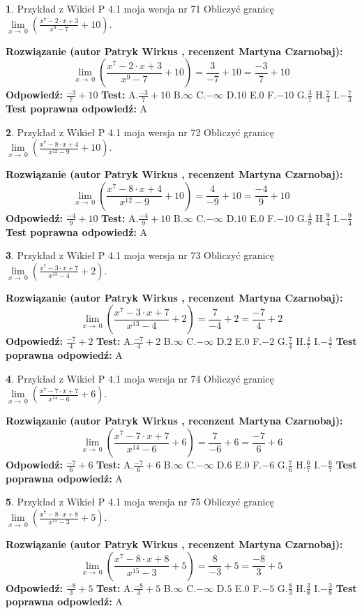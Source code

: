 \documentclass[12pt, a4paper]{article}
\theoremstyle{definition} %
\newtheorem{zad}{}
\newcommand{\zadStart}[1]{\begin{zad}#1\newline}
\newcommand{\zadStop}{\end{zad}}
\newcommand{\rozwStart}[2]{\noindent \textbf{Rozwiązanie (autor #1 , recenzent #2): }\newline}
\newcommand{\rozwStop}{\newline}
\newcommand{\odpStart}{\noindent \textbf{Odpowiedź:}\newline}
\newcommand{\odpStop}{\newline}
\newcommand{\testStart}{\noindent \textbf{Test:}\newline}
\newcommand{\testStop}{\newline}
\newcommand{\kluczStart}{\noindent \textbf{Test poprawna odpowiedź:}\newline}
\newcommand{\kluczStop}{\newline}
\begin{document}
\zadStart{Przykład z Wikieł P 4.1 moja wersja nr 71}
Obliczyć granicę $\lim\limits_{x\to\ 0}(\frac{x^{7}-2 \cdot x +3}{x^{9}-7}+10)$.
\zadStop
\rozwStart{Patryk Wirkus}{Martyna Czarnobaj}
$$\lim\limits_{x\to\ 0}(\frac{x^{7}-2 \cdot x +3}{x^{9}-7}+10)=\frac{3}{-7}+10=\frac{-3}{7}+10$$
\rozwStop
\odpStart
$\frac{-3}{7}+10$
\odpStop
\testStart
A.$\frac{-3}{7}+10$
B.$\infty$
C.$-\infty$
D.$10$
E.$0$
F.$-10$
G.$\frac{3}{7}$
H.$\frac{7}{3}$
I.$-\frac{7}{3}$
\testStop
\kluczStart
A
\kluczStop



\zadStart{Przykład z Wikieł P 4.1 moja wersja nr 72}
Obliczyć granicę $\lim\limits_{x\to\ 0}(\frac{x^{7}-8 \cdot x +4}{x^{12}-9}+10)$.
\zadStop
\rozwStart{Patryk Wirkus}{Martyna Czarnobaj}
$$\lim\limits_{x\to\ 0}(\frac{x^{7}-8 \cdot x +4}{x^{12}-9}+10)=\frac{4}{-9}+10=\frac{-4}{9}+10$$
\rozwStop
\odpStart
$\frac{-4}{9}+10$
\odpStop
\testStart
A.$\frac{-4}{9}+10$
B.$\infty$
C.$-\infty$
D.$10$
E.$0$
F.$-10$
G.$\frac{4}{9}$
H.$\frac{9}{4}$
I.$-\frac{9}{4}$
\testStop
\kluczStart
A
\kluczStop



\zadStart{Przykład z Wikieł P 4.1 moja wersja nr 73}
Obliczyć granicę $\lim\limits_{x\to\ 0}(\frac{x^{7}-3 \cdot x +7}{x^{13}-4}+2)$.
\zadStop
\rozwStart{Patryk Wirkus}{Martyna Czarnobaj}
$$\lim\limits_{x\to\ 0}(\frac{x^{7}-3 \cdot x +7}{x^{13}-4}+2)=\frac{7}{-4}+2=\frac{-7}{4}+2$$
\rozwStop
\odpStart
$\frac{-7}{4}+2$
\odpStop
\testStart
A.$\frac{-7}{4}+2$
B.$\infty$
C.$-\infty$
D.$2$
E.$0$
F.$-2$
G.$\frac{7}{4}$
H.$\frac{4}{7}$
I.$-\frac{4}{7}$
\testStop
\kluczStart
A
\kluczStop



\zadStart{Przykład z Wikieł P 4.1 moja wersja nr 74}
Obliczyć granicę $\lim\limits_{x\to\ 0}(\frac{x^{7}-7 \cdot x +7}{x^{14}-6}+6)$.
\zadStop
\rozwStart{Patryk Wirkus}{Martyna Czarnobaj}
$$\lim\limits_{x\to\ 0}(\frac{x^{7}-7 \cdot x +7}{x^{14}-6}+6)=\frac{7}{-6}+6=\frac{-7}{6}+6$$
\rozwStop
\odpStart
$\frac{-7}{6}+6$
\odpStop
\testStart
A.$\frac{-7}{6}+6$
B.$\infty$
C.$-\infty$
D.$6$
E.$0$
F.$-6$
G.$\frac{7}{6}$
H.$\frac{6}{7}$
I.$-\frac{6}{7}$
\testStop
\kluczStart
A
\kluczStop



\zadStart{Przykład z Wikieł P 4.1 moja wersja nr 75}
Obliczyć granicę $\lim\limits_{x\to\ 0}(\frac{x^{7}-8 \cdot x +8}{x^{15}-3}+5)$.
\zadStop
\rozwStart{Patryk Wirkus}{Martyna Czarnobaj}
$$\lim\limits_{x\to\ 0}(\frac{x^{7}-8 \cdot x +8}{x^{15}-3}+5)=\frac{8}{-3}+5=\frac{-8}{3}+5$$
\rozwStop
\odpStart
$\frac{-8}{3}+5$
\odpStop
\testStart
A.$\frac{-8}{3}+5$
B.$\infty$
C.$-\infty$
D.$5$
E.$0$
F.$-5$
G.$\frac{8}{3}$
H.$\frac{3}{8}$
I.$-\frac{3}{8}$
\testStop
\kluczStart
A
\kluczStop
\end{document}

